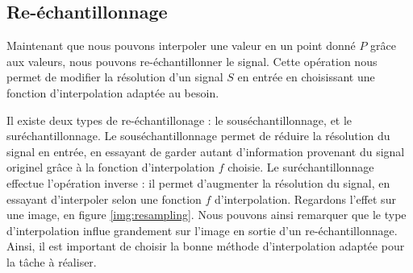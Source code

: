 {{		\subsection{Re-échantillonnage}
		{
			Maintenant que nous pouvons interpoler une valeur en un point donné $P$ grâce aux valeurs, nous pouvons re-échantillonner le signal. Cette opération nous permet de modifier la résolution d'un signal $S$ en entrée en choisissant une fonction d'interpolation adaptée au besoin.

			Il existe deux types de re-échantillonage : le souséchantillonnage, et le suréchantillonnage. Le souséchantillonnage permet de réduire la résolution du signal en entrée, en essayant de garder autant d'information provenant du signal originel grâce à la fonction d'interpolation $f$ choisie. Le suréchantillonnage effectue l'opération inverse : il permet d'augmenter la résolution du signal, en essayant d'interpoler selon une fonction $f$ d'interpolation. Regardons l'effet sur une image, en figure \ref{img:resampling}. Nous pouvons ainsi remarquer que le type d'interpolation influe grandement sur l'image en sortie d'un re-échantillonnage. Ainsi, il est important de choisir la bonne méthode d'interpolation adaptée pour la tâche à réaliser.

}}}
